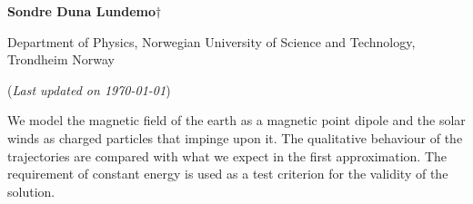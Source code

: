 


	
\begin{titlepage}
	\begin{center}
	\setlength{\parskip}{0em}
	\thispagestyle{titlepage}
	

	\vspace{4mm}
	
	\large{\textbf{Sondre Duna Lundemo}}$\dagger$
	
	\normalsize{Department of Physics, Norwegian University of Science and Technology, Trondheim Norway 
	}

	(\textit{Last updated on \today})
	\end{center}

	\setlength{\parindent}{2em}
	
	We model the magnetic field of the earth as a magnetic point dipole and the solar winds as charged particles that impinge upon it. The qualitative behaviour of the trajectories are compared with what we expect in the first approximation.
	The requirement of constant energy is used as a test criterion for the validity of the solution.
	
	\begin{figure}
		
	\end{figure}
	

\end{titlepage}

\setlength{\parskip}{1em}
\newpage









